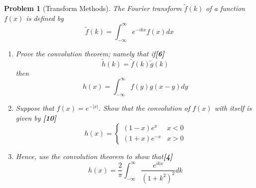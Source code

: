 \documentclass[a4paper]{article}
\theoremstyle{new}
\newtheorem{qns}{Problem}[section]
\begin{document}
\begin{qns}[Transform Methods]
The Fourier transform $\tilde{f}(k)$ of a function $f(x)$ is defined by
$$\tilde{f}(k)=\int_{-\infty}^\infty e^{-ikx}f(x)dx$$
\begin{enumerate}[label=(\roman*)]
\item Prove the convolution theorem; namely that if\hfill\textbf{[6]}
$$\tilde{h}(k)=\tilde{f}(k)\tilde{g}(k)$$
then
$$h(x)=\int_{-\infty}^\infty f(y)g(x-y)dy$$
\item Suppose that $f(x) = e^{−|x|}$. Show that the convolution of $f(x)$ with itself is given by \hfill\textbf{[10]}
$$h(x)=
\left\{
        \begin{array}{ll}
      (1-x)e^x & x<0 \\
      (1+x)e^{-x} & x>0
        \end{array}
    \right.$$
\item Hence, use the convolution theorem to show that\hfill\textbf{[4]}
$$h(x)=\frac{2}{\pi}\int_{-\infty}^\infty\frac{e^{ikx}}{(1+k^2)^2}dk$$
\end{enumerate}
\end{qns}
\end{document}
